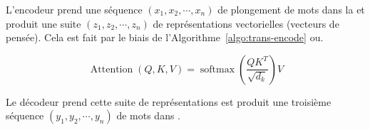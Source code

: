 L'encodeur prend une séquence \((x_1, x_2, \cdots, x_n)\) de plongement de mots dans la  
et produit une suite \((z_1, z_2, \cdots, z_n)\) de représentations vectorielles (vecteurs de pensée).
Cela est fait par le biais de l'Algorithme~\ref{algo:trans-encode} ou.

\[
    \operatorname{Attention}(Q, K, V)=\operatorname{softmax}\left(\frac{Q K^T}{\sqrt{d_k}}\right) V
\]
    
    

% 

Le décodeur prend cette suite de représentations est produit une troisième séquence 
\((y_1, y_2, \cdots, y_n)\)
de mots dans .

